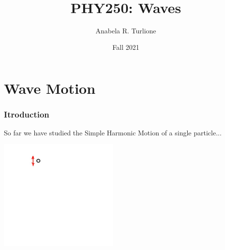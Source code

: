 \documentclass[]{beamer}
\title{PHY250: Waves}    %
\author{Anabela R. Turlione}                 %
\institute{Digipen}      %
\date{Fall 2021}                    %
\begin{document}
\begin{frame}
  \titlepage
\end{frame}

\section[]{}

\begin{frame}
  \tableofcontents
\end{frame}




\section{Wave Motion}

\begin{frame}
\frametitle{Itroduction}

So far we have studied the Simple Harmonic Motion of a single particle...

\begin{center}
  \includegraphics[height=2.2in]{images4/0b.jpg}
\end{center}

  \end{frame}
\end{document}
